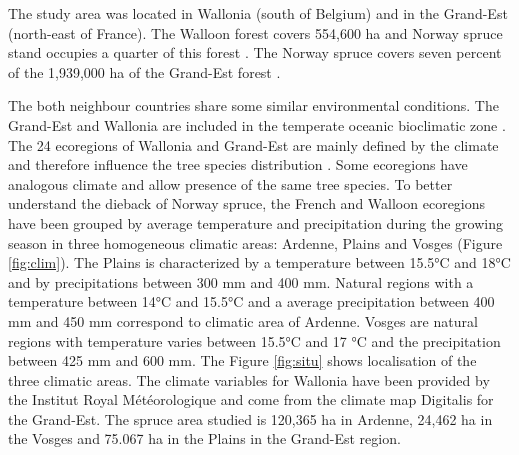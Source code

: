 \documentclass[3p,procedia]{elsarticle}
\begin{document}
The study area was located in Wallonia (south of Belgium) and in the Grand-Est (north-east of France).
The Walloon forest covers 554,600 ha and  Norway spruce stand occupies a quarter of this forest \citep{Alderweireld_2015}. 
The Norway spruce covers seven percent of the 1,939,000 ha of the Grand-Est forest \citep{IGN2022}. 

The both neighbour countries share some similar environmental conditions.
The Grand-Est and Wallonia are included in the temperate oceanic bioclimatic zone \citep{lindner_climate_2010}.
The 24 ecoregions of Wallonia and Grand-Est are mainly defined by the climate and therefore influence the tree species distribution \citep{walthert_tree_2017}.
Some ecoregions have analogous climate and allow presence of the same tree species.
To better understand the dieback of Norway spruce, the French and Walloon ecoregions have been grouped by average temperature and precipitation during the growing season in three homogeneous climatic areas: Ardenne, Plains and Vosges (Figure \ref{fig:clim}).
The Plains is characterized by a temperature between 15.5°C and 18°C and by precipitations between 300 mm and 400 mm.
Natural regions with a temperature between 14°C and 15.5°C and a average precipitation between 400 mm and 450 mm correspond to climatic area of Ardenne.
Vosges are natural regions with temperature varies between 15.5°C and 17 °C and the precipitation between 425 mm and 600 mm.
The Figure \ref{fig:situ} shows localisation of the three climatic areas. 
The climate variables for Wallonia have been provided by the Institut Royal Météorologique and come from the climate map Digitalis \citep{piedallu_presentation_2014} for the Grand-Est.
The spruce area studied is 120,365 ha in Ardenne, 24,462 ha in the Vosges and 75.067 ha in the Plains in the Grand-Est region.
\end{document}
